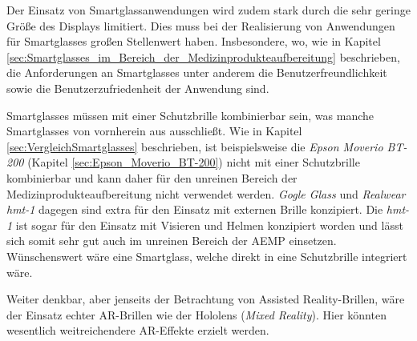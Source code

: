 Der Einsatz von Smartglassanwendungen wird zudem stark durch die sehr geringe Größe des Displays limitiert. Dies muss bei der Realisierung von Anwendungen für Smartglasses großen Stellenwert haben. Insbesondere, wo, wie in Kapitel \ref{sec:Smartglasses_im_Bereich_der_Medizinprodukteaufbereitung} beschrieben, die Anforderungen an Smartglasses unter anderem die Benutzerfreundlichkeit sowie die Benutzerzufriedenheit der Anwendung sind.

Smartglasses müssen mit einer Schutzbrille kombinierbar sein, was manche Smartglasses von vornherein aus ausschließt. Wie in Kapitel \ref{sec:VergleichSmartglasses} beschrieben, ist beispielsweise die \emph{Epson Moverio BT-200} (Kapitel \ref{sec:Epson_Moverio_BT-200}) nicht mit einer Schutzbrille kombinierbar und kann daher für den unreinen Bereich der Medizinprodukteaufbereitung nicht verwendet werden. \emph{Gogle Glass} und \emph{Realwear hmt-1} dagegen sind extra für den Einsatz mit externen Brille konzipiert. Die \emph{hmt-1} ist sogar für den Einsatz mit Visieren und Helmen konzipiert worden und lässt sich somit sehr gut auch im unreinen Bereich der AEMP einsetzen. Wünschenswert wäre eine Smartglass, welche direkt in eine Schutzbrille integriert wäre.

Weiter denkbar, aber jenseits der Betrachtung von Assisted Reality-Brillen, wäre der Einsatz echter AR-Brillen wie der Hololens (\emph{Mixed Reality}). Hier könnten wesentlich weitreichendere AR-Effekte erzielt werden. 
